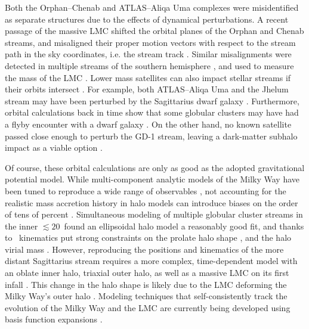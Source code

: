\documentclass[final,5p,times,twocolumn,authoryear]{elsarticle}
\begin{document}
Both the Orphan--Chenab and ATLAS--Aliqa Uma complexes were misidentified as separate structures due to the effects of dynamical perturbations.
A recent passage of the massive LMC shifted the orbital planes of the Orphan and Chenab streams, and misaligned their proper motion vectors with respect to the stream path in the sky coordinates, i.e. the stream track \citep{erkal:2019}.
Similar misalignments were detected in multiple streams of the southern hemisphere \citep{shipp:2019}, and used to measure the mass of the LMC \citep[$\gtrsim10^{11}\,\unit{\msun}$;][]{erkal:2019, shipp:2021, koposov:2023}.
Lower mass satellites can also impact stellar streams if their orbits intersect \citep[e.g.,][]{dillamore:2022}.
For example, both ATLAS--Aliqa Uma and the Jhelum stream may have been perturbed by the Sagittarius dwarf galaxy \citep[respectively; see also Section~\ref{sec:structure}]{li:2019,woudenberg:2023}.
Furthermore, orbital calculations back in time show that some globular clusters may have had a flyby encounter with a dwarf galaxy \citep{garrow:2020, el-falou:2022}.
On the other hand, no known satellite passed close enough to perturb the GD-1 stream, leaving a dark-matter subhalo impact as a viable option \citep{bonaca:2019, doke:2022}.

Of course, these orbital calculations are only as good as the adopted gravitational potential model.
While multi-component analytic models of the Milky Way have been tuned to reproduce a wide range of observables \citep[e.g.,][]{bovy:2015, mcmillan:2017,price-whelan:2017}, not accounting for the realistic mass accretion history in halo models can introduce biases on the order of tens of percent \citep[e.g.,][]{bonaca:2014, dsouza:2022, arora:2022, santistevan:2024}.
Simultaneous modeling of multiple globular cluster streams in the inner $\lesssim20$\,\unit{\kpc} found an ellipsoidal halo model a reasonably good fit, and thanks to \gaia\ kinematics put strong constraints on the prolate halo shape \citep[$q_z=1.06\pm0.06$;][]{palau:2023}, and the halo virial mass \citep[$M_{200}=1.09^{+0.19}_{-0.14}\times10^{12}\,\unit{\msun}$;][see also \citealt{reino:2021}]{ibata:2023}.
However, reproducing the positions and kinematics of the more distant Sagittarius stream requires a more complex, time-dependent model with an oblate inner halo, triaxial outer halo, as well as a massive LMC on its first infall \citep{vasiliev:2021,kang:2023}.
This change in the halo shape is likely due to the LMC deforming the Milky Way's outer halo \citep[e.g.,][]{garavito-camargo:2019,shao:2021,vasiliev:2023}.
Modeling techniques that self-consistently track the evolution of the Milky Way and the LMC are currently being developed using basis function expansions \citep[e.g.,][]{sanders:2020,garavito-camargo:2021,lilleengen:2023}.
\end{document}
